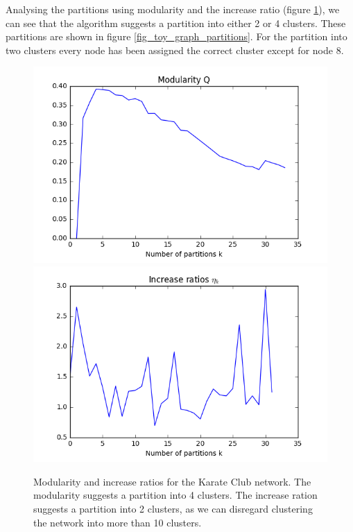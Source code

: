 \documentclass[12pt]{article}
\theoremstyle{definition}
\begin{document}
Analysing the partitions using modularity and the increase ratio (figure \ref{fig_karate_eval}), we can see that the algorithm suggests a partition into either 2 or 4 clusters. These partitions are shown in figure \ref{fig_toy_graph_partitions}. For the partition into two clusters every node has been assigned the correct cluster except for node 8.

\begin{figure}
	\includegraphics[scale=0.44]{karate_graph_Q}
	\includegraphics[scale=0.44]{karate_graph_eta}
	\centering
	\caption{Modularity and increase ratios for the Karate Club network. The modularity suggests a partition into 4 clusters. The increase ration suggests a partition into 2 clusters, as we can disregard clustering the network into more than 10 clusters.}
	\label{fig_karate_eval}
\end{figure}
\end{document}
